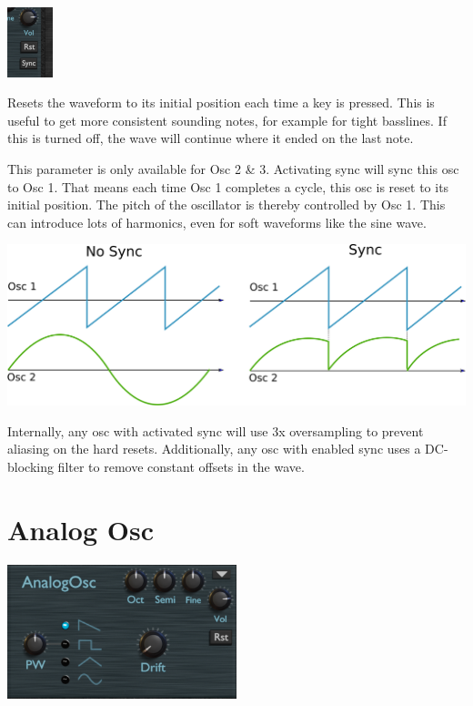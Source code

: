 \begin{center}
    \includegraphics[width=0.1\textwidth]{graphics/osc_common2.png}
\end{center}

{Resets the waveform to its initial position each time a key is pressed. This is useful to get more consistent sounding notes, for example for tight basslines. If this is turned off, the wave will continue where it ended on the last note.}

{This parameter is only available for Osc 2 \& 3. Activating sync will sync this osc to Osc 1. That means each time Osc 1 completes a cycle, this osc is reset to its initial position. The pitch of the oscillator is thereby controlled by Osc 1. This can introduce lots of harmonics, even for soft waveforms like the sine wave.

\vspace{5mm}

\includegraphics[width=\textwidth]{graphics/osc_sync.png}

Internally, any osc with activated sync will use 3x oversampling to prevent aliasing on the hard resets. Additionally, any osc with enabled sync uses a DC-blocking filter to remove constant offsets in the wave.}

\section{Analog Osc}

\begin{center}
    \includegraphics[width=0.5\textwidth]{graphics/analog_osc.png}
\end{center}

